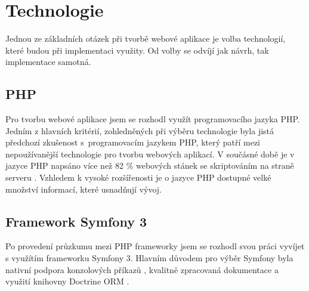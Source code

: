 \section{Technologie}
Jednou ze základních otázek při tvorbě webové aplikace je volba technologií, které budou při implementaci využity. Od volby se odvíjí jak návrh, tak implementace samotná. 

\subsection{PHP}
Pro tvorbu webové aplikace jsem se rozhodl využít programovacího jazyka \gls{PHP}. Jedním z hlavních kritérií, zohledněných při výběru technologie byla jistá předchozí zkušenost s~programovacím jazykem PHP, který patří mezi nepoužívanější technologie pro tvorbu webových aplikací. V součásné době je v jazyce PHP napsáno více než 82 \% webových stánek se skriptováním na straně serveru \autocite{web:statistics}. Vzhledem k vysoké rozšířenosti je o jazyce PHP dostupné velké množství informací, které usnadňují vývoj. 

\subsection{Framework Symfony 3}
Po provedení průzkumu mezi PHP frameworky jsem se rozhodl svou práci vyvíjet s využítím frameworku Symfony 3. Hlavním důvodem pro výběr Symfony byla nativní podpora konzolových příkazů \autocite{symfony:console}, kvalitně zpracovaná dokumentace a využití knihovny Doctrine \gls{ORM} \autocite{symfony:doctrine}.